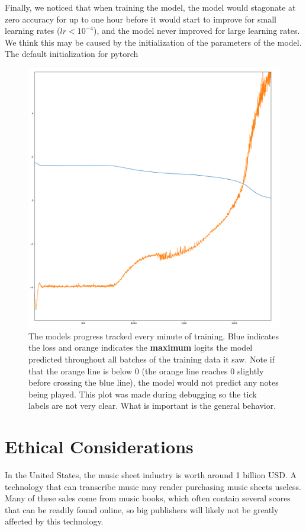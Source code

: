 \documentclass[a4paper,twocolumn,10pt]{article}
\begin{document}
Finally, we noticed that when training the model, the model would stagonate at zero accuracy for up to one hour before it would start to improve for small learning rates (\(lr<10^{-4}\)), and the model never improved for large learning rates. We think this may be caused by the initialization of the parameters of the model. The default initialization for pytorch  

\begin{figure}[H]
  \centering
  \includegraphics[width=\linewidth]{figures/debug.png}
  \caption{The models progress tracked every minute of training. Blue indicates the loss and orange indicates the \textbf{maximum} logits the model predicted throughout all batches of the training data it saw. Note if that the orange line is below 0 (the orange line reaches 0 slightly before crossing the blue line), the model would not predict any notes being played. This plot was made during debugging so the tick labels are not very clear. What is important is the general behavior.}
  \label{fig:lr}
\end{figure}

\section{Ethical Considerations}
In the United States, the music sheet industry is worth around 1 billion USD\cite{musicspoke}. A technology that can transcribe music may render purchasing music sheets useless. Many of these sales come from music books, which often contain several scores that can be readily found online, so big publishers will likely not be greatly affected by this technology.
\end{document}
